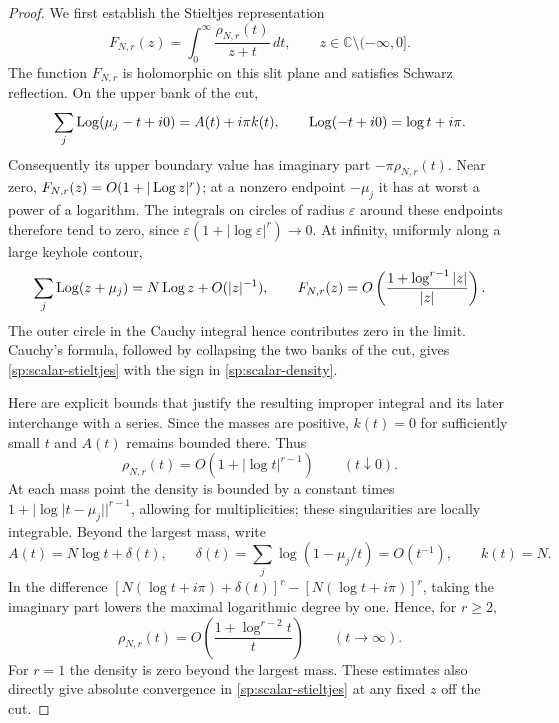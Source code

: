 \begin{proof}
We first establish the Stieltjes representation
\begin{equation}
 F_{N,r}(z)=\int_0^{\infty}\frac{\rho_{N,r}(t)}{z+t}\,dt,
 \qquad z\in\mathbb C\setminus(-\infty,0].
 \label{sp:scalar-stieltjes}
\end{equation}
The function $F_{N,r}$ is holomorphic on this slit plane and
satisfies Schwarz reflection.  On the upper bank of the cut,
\[
 \sum_j\operatorname{Log}(\mu_j-t+i0)=A(t)+i\pi k(t),
 \qquad \operatorname{Log}(-t+i0)=\log t+i\pi.
\]
Consequently its upper boundary value has imaginary part
$-\pi\rho_{N,r}(t)$.  Near zero,
$F_{N,r}(z)=O(1+|\operatorname{Log} z|^r)$; at a nonzero endpoint $-\mu_j$
it has at worst a power of a logarithm.  The integrals on circles
of radius $\varepsilon$ around these endpoints therefore tend to
zero, since $\varepsilon(1+|\log\varepsilon|^r)\to0$.
At infinity, uniformly along a large keyhole contour,
\[
 \sum_j\operatorname{Log}(z+\mu_j)
       =N\operatorname{Log} z+O(|z|^{-1}),
 \qquad
 F_{N,r}(z)=O\left(\frac{1+\log^{r-1}|z|}{|z|}\right).
\]
The outer circle in the Cauchy integral hence contributes zero
in the limit.  Cauchy's formula, followed by collapsing the two
banks of the cut, gives \eqref{sp:scalar-stieltjes} with the sign
in \eqref{sp:scalar-density}.

Here are explicit bounds that justify the resulting improper
integral and its later interchange with a series.  Since the
masses are positive, $k(t)=0$ for sufficiently small $t$ and
$A(t)$ remains bounded there.  Thus
\begin{equation}
 \rho_{N,r}(t)=O(1+|\log t|^{r-1})\qquad(t\downarrow0).
 \label{sp:density-zero-bound}
\end{equation}
At each mass point the density is bounded by a constant times
$1+|\log|t-\mu_j||^{r-1}$, allowing for multiplicities; these
singularities are locally integrable.  Beyond the largest mass,
write
\[
 A(t)=N\log t+\delta(t),\qquad
 \delta(t)=\sum_j\log(1-\mu_j/t)=O(t^{-1}),\qquad k(t)=N.
\]
In the difference
$[N(\log t+i\pi)+\delta(t)]^r-[N(\log t+i\pi)]^r$,
taking the imaginary part lowers the maximal logarithmic degree
by one.  Hence, for $r\geq2$,
\begin{equation}
 \rho_{N,r}(t)=O\left(\frac{1+\log^{r-2}t}{t}\right)
       \qquad(t\to\infty).
 \label{sp:density-infinity-bound}
\end{equation}
For $r=1$ the density is zero beyond the largest mass.
These estimates also directly give absolute convergence in
\eqref{sp:scalar-stieltjes} at any fixed $z$ off the cut.


\end{proof}
